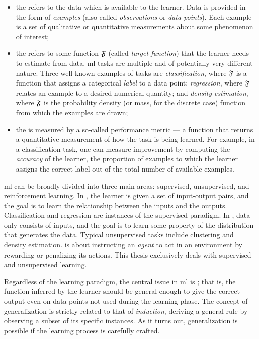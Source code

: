 \begin{itemize}
    \item the  refers to the data which is available to the learner. Data is provided in the form of \emph{examples} (also called \emph{observations} or \emph{data points}). Each example is a set of qualitative or quantitative measurements about some phenomenon of interest;
    \item the  refers to some function $\mathfrak{F}$ (called \emph{target function}) that the learner needs to estimate from data. \gls{ml} tasks are multiple and of potentially very different nature. Three well-known examples of tasks are \emph{classification}, where $\mathfrak{F}$ is a function that assigns a categorical \emph{label} to a data point; \emph{regression}, where $\mathfrak{F}$ relates an example to a desired numerical quantity; and \emph{density estimation}, where $\mathfrak{F}$ is the probability density (or mass, for the discrete case) function from which the examples are drawn;
    \item the  is measured by a so-called performance metric --- a function that returns a quantitative measurement of how  the task is being learned. For example, in a classification task, one can measure improvement by computing the \emph{accuracy} of the learner, \ie the proportion of examples to which the learner assigns the correct label out of the total number of available examples.
\end{itemize}

\gls{ml} can be broadly divided into three main areas: supervised, unsupervised, and reinforcement learning. In , the learner is given a set of input-output pairs, and the goal is to learn the relationship between the inputs and the outputs. Classification and regression are instances of the supervised paradigm. In , data only consists of inputs, and the goal is to learn some property of the distribution that generates the data. Typical unsupervised tasks include clustering and density estimation.  \citep{sutton1998rl} is about instructing an \emph{agent} to act in an environment by rewarding or penalizing its actions. This thesis exclusively deals with supervised and unsupervised learning.

Regardless of the learning paradigm, the central issue in \gls{ml} is ; that is, the function inferred by the learner should be general enough to give the correct output even on data points not used during the learning phase. The concept of generalization is strictly related to that of \emph{induction}, \ie deriving a general rule by observing a subset of its specific instances. As it turns out, generalization is possible if the learning process is carefully crafted.


